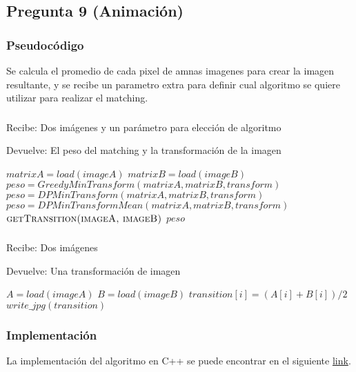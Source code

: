 \subsection*{Pregunta 9 (Animación)}

\subsubsection*{Pseudocódigo}
Se calcula el promedio de cada pixel de amnas imagenes para crear la imagen resultante, y se recibe un parametro extra para definir cual algoritmo se quiere utilizar para realizar el matching.
\subsubsection*{}
Recibe: Dos imágenes y un parámetro para elección de algoritmo

Devuelve: El peso del matching y la transformación de la imagen
\begin{algorithmic}[1]
  \STATE $matrixA = load(imageA)$
  \STATE $matrixB = load(imageB)$
    \STATE $peso = GreedyMinTransform(matrixA, matrixB, transform)$
    \STATE $peso = DPMinTransform(matrixA, matrixB, transform)$
    \STATE $peso = DPMinTransformMean(matrixA, matrixB, transform)$
  \ENDIF
  \STATE $\textsc{getTransition(imageA, imageB)}$
  \RETURN $peso$
\end{algorithmic}

\subsubsection*{}
Recibe: Dos imágenes

Devuelve: Una transformación de imagen
\begin{algorithmic}[1]
  \STATE $A = load(imageA)$
  \STATE $B = load(imageB)$
    \STATE $transition[i] = (A[i] + B[i])/2$
  \ENDFOR
  \STATE $write\_jpg(transition)$
\end{algorithmic}

\subsubsection*{Implementación}
La implementación del algoritmo en C++ se puede encontrar en el siguiente \href{https://github.com/Guillermo598/ProyectoADA/blob/master/Pregunta9.cpp}{link}.